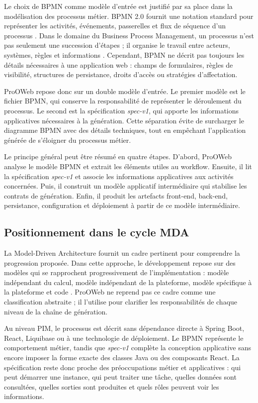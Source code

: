 Le choix de BPMN comme modèle d'entrée est justifié par sa place dans la modélisation des processus métier. BPMN 2.0 fournit une notation standard pour représenter les activités, événements, passerelles et flux de séquence d'un processus \cite{omg2013bpmn}. Dans le domaine du Business Process Management, un processus n'est pas seulement une succession d'étapes ; il organise le travail entre acteurs, systèmes, règles et informations \cite{dumas2018fundamentals,weske2012bpm}. Cependant, BPMN ne décrit pas toujours les détails nécessaires à une application web : champs de formulaires, règles de visibilité, structures de persistance, droits d'accès ou stratégies d'affectation.

ProOWeb repose donc sur un double modèle d'entrée. Le premier modèle est le fichier BPMN, qui conserve la responsabilité de représenter le déroulement du processus. Le second est la spécification \textit{spec-v1}, qui apporte les informations applicatives nécessaires à la génération. Cette séparation évite de surcharger le diagramme BPMN avec des détails techniques, tout en empêchant l'application générée de s'éloigner du processus métier.

Le principe général peut être résumé en quatre étapes. D'abord, ProOWeb analyse le modèle BPMN et extrait les éléments utiles au workflow. Ensuite, il lit la spécification \textit{spec-v1} et associe les informations applicatives aux activités concernées. Puis, il construit un modèle applicatif intermédiaire qui stabilise les contrats de génération. Enfin, il produit les artefacts front-end, back-end, persistance, configuration et déploiement à partir de ce modèle intermédiaire.

\subsection{Positionnement dans le cycle MDA}

La Model-Driven Architecture fournit un cadre pertinent pour comprendre la progression proposée. Dans cette approche, le développement repose sur des modèles qui se rapprochent progressivement de l'implémentation : modèle indépendant du calcul, modèle indépendant de la plateforme, modèle spécifique à la plateforme et code \cite{omg2014mda,mellor2003mda}. ProOWeb ne reprend pas ce cadre comme une classification abstraite ; il l'utilise pour clarifier les responsabilités de chaque niveau de la chaîne de génération.

Au niveau PIM, le processus est décrit sans dépendance directe à Spring Boot, React, Liquibase ou à une technologie de déploiement. Le BPMN représente le comportement métier, tandis que \textit{spec-v1} complète la conception applicative sans encore imposer la forme exacte des classes Java ou des composants React. La spécification reste donc proche des préoccupations métier et applicatives : qui peut démarrer une instance, qui peut traiter une tâche, quelles données sont consultées, quelles sorties sont produites et quels rôles peuvent voir les informations.

